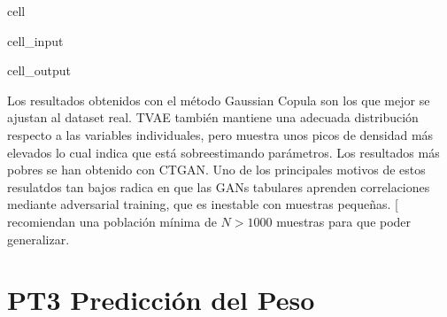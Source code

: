 \documentclass[a4paper,10pt,spanish]{jupyterBook}
\begin{document}
\begin{sphinxuseclass}{cell}
\begin{sphinxVerbatimInput}
\begin{sphinxuseclass}{cell_input}
\end{sphinxuseclass}\end{sphinxVerbatimInput}
\begin{sphinxVerbatimOutput}

\begin{sphinxuseclass}{cell_output}
\noindent{}

\end{sphinxuseclass}\end{sphinxVerbatimOutput}

\end{sphinxuseclass}
\sphinxAtStartPar
Los resultados obtenidos con el método Gaussian Copula son los que mejor se ajustan al dataset real. TVAE también mantiene una adecuada distribución respecto a las variables individuales, pero muestra unos picos de densidad más elevados lo cual indica que está sobreestimando parámetros. Los resultados más pobres se han obtenido con CTGAN. Uno de los principales motivos de estos resulatdos tan bajos radica en que las GANs tabulares aprenden correlaciones mediante adversarial training, que es inestable con muestras pequeñas. {[}\sphinxhref{https://doi.org/10.48550/arXiv.1907.00503}{Xu et al., 2019}{]} recomiendan una población mínima de \(N>1000\) muestras para que poder generalizar.

\sphinxstepscope


\part{PT3 \sphinxhyphen{} Predicción del Peso}

\sphinxstepscope
\end{document}
